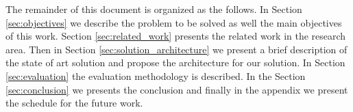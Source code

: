The remainder of this document is organized as the follows. In Section \ref{sec:objectives} we describe the problem to be solved as well the main objectives of this work. Section \ref{sec:related_work} presents the related work in the research area. Then in Section
\ref{sec:solution_architecture} we present a brief description of the state of art solution and propose the architecture for our solution. In Section \ref{sec:evaluation} the evaluation methodology is described. In the Section \ref{sec:conclusion} we presents the conclusion and finally
in the appendix we present the schedule for the future work.
